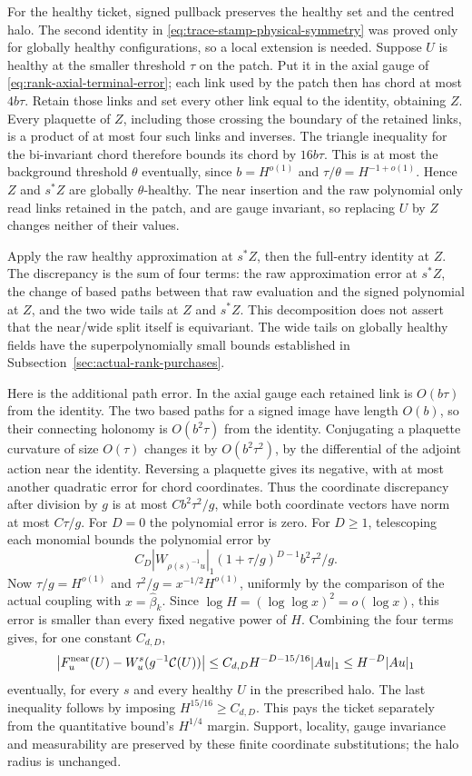 For the healthy ticket, signed pullback preserves the healthy set and
the centred halo. The second identity in
\eqref{eq:trace-stamp-physical-symmetry} was proved only for globally
healthy configurations, so a local extension is needed. Suppose $U$
is healthy at the smaller threshold $\tau$ on the patch. Put it in
the axial gauge of \eqref{eq:rank-axial-terminal-error}; each link
used by the patch then has chord at most $4b\tau$. Retain those
links and set every other link equal to the identity, obtaining $Z$.
Every plaquette of $Z$, including those crossing the boundary of the
retained links, is a product of at most four such links and inverses.
The triangle inequality for the bi-invariant chord therefore bounds
its chord by $16b\tau$. This is at most the background threshold
$\theta$ eventually, since $b=H^{o(1)}$ and
$\tau/\theta=H^{-1+o(1)}$. Hence $Z$ and $s^*Z$ are globally
$\theta$-healthy. The near insertion and the raw polynomial only
read links retained in the patch, and are gauge invariant, so replacing
$U$ by $Z$ changes neither of their values.

Apply the raw healthy approximation at $s^*Z$, then the full-entry
identity at $Z$. The discrepancy is the sum of four terms: the raw
approximation error at $s^*Z$, the change of based paths between that
raw evaluation and the signed polynomial at $Z$, and the two wide
tails at $Z$ and $s^*Z$. This decomposition does not assert that the
near/wide split itself is equivariant. The wide tails on globally
healthy fields have the superpolynomially small bounds established in
Subsection~\ref{sec:actual-rank-purchases}.

Here is the additional path error. In the axial gauge each retained
link is $O(b\tau)$ from the identity. The two based paths for a
signed image have length $O(b)$, so their connecting holonomy is
$O(b^2\tau)$ from the identity. Conjugating a plaquette curvature of
size $O(\tau)$ changes it by $O(b^2\tau^2)$, by the differential of
the adjoint action near the identity. Reversing a plaquette gives its
negative, with at most another quadratic error for chord coordinates.
Thus the coordinate discrepancy after division by $g$ is at most
$Cb^2\tau^2/g$, while both coordinate vectors have norm at most
$C\tau/g$. For $D=0$ the polynomial error is zero. For $D\ge1$, telescoping each monomial bounds the polynomial error by
\[
 C_D|W_{\rho(s)^{-1}u}|_1
       (1+\tau/g)^{D-1}b^2\tau^2/g.
\]
Now $\tau/g=H^{o(1)}$ and
$\tau^2/g=x^{-1/2}H^{o(1)}$, uniformly by the comparison of the
actual coupling with $x=\widehat\beta_k$. Since
$\log H=(\log\log x)^2=o(\log x)$, this error is smaller than
every fixed negative power of $H$. Combining the four terms gives,
for one constant $C_{d,D}$,
\[
 \bigl|F_u^{\rm near}(U)-W^s_u(g^{-1}\mathcal C(U))\bigr|
       \le C_{d,D}H^{-D-15/16}|Au|_1
       \le H^{-D}|Au|_1
\]
eventually, for every $s$ and every healthy $U$ in the prescribed halo.
The last inequality follows by imposing $H^{15/16}\ge C_{d,D}$.
This pays the ticket separately from the quantitative bound's $H^{1/4}$ margin.
Support, locality, gauge invariance and measurability are preserved by
these finite coordinate substitutions; the halo radius is unchanged.

